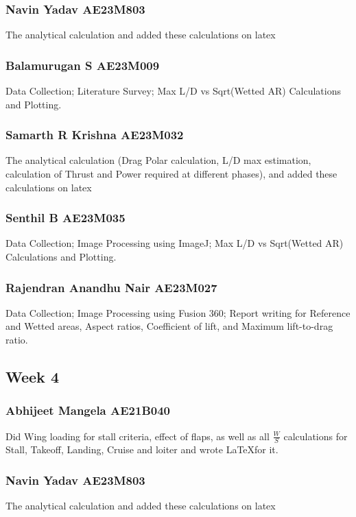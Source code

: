 \documentclass[12 pt]{article}
\begin{document}
\subsubsection{Navin Yadav AE23M803}
The analytical calculation and added these calculations on latex 

\subsubsection{Balamurugan S AE23M009}
Data Collection; Literature Survey; Max L/D vs Sqrt(Wetted AR) Calculations and Plotting.


\subsubsection{Samarth R Krishna AE23M032}
The analytical calculation (Drag Polar calculation, L/D max estimation, calculation of Thrust and Power required at different phases), and added these calculations on latex


\subsubsection{Senthil B AE23M035}
Data Collection; Image Processing using ImageJ; Max L/D vs Sqrt(Wetted AR) Calculations and Plotting.


\subsubsection{Rajendran Anandhu Nair AE23M027}
Data Collection; Image Processing using Fusion 360; Report writing for Reference and Wetted areas, Aspect ratios, Coefficient of lift, and Maximum lift-to-drag ratio. 

\subsection{Week 4}


\subsubsection{Abhijeet Mangela AE21B040}
Did Wing loading for stall criteria, effect of flaps, as well as all $\frac{W}{S}$ calculations for Stall, Takeoff, Landing, Cruise and loiter and wrote \LaTeX for it.

\subsubsection{Navin Yadav AE23M803}
The analytical calculation and added these calculations on latex 
\end{document}
